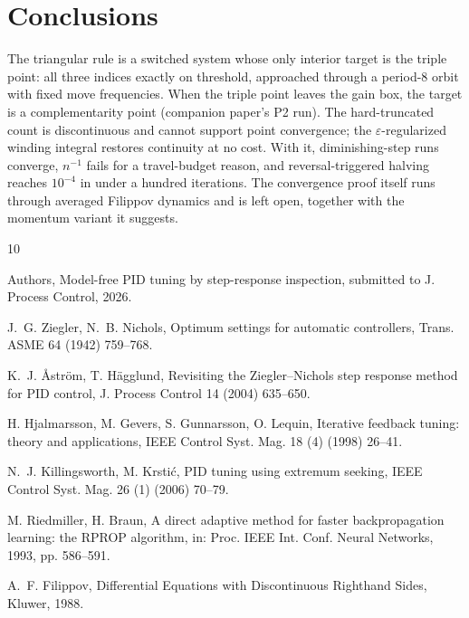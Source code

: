 \documentclass[twocolumn]{ifacconf}
\begin{document}
\section{Conclusions}

The triangular rule is a switched system whose only interior target is the
triple point: all three indices exactly on threshold, approached through a
period-8 orbit with fixed move frequencies. When the triple point leaves the
gain box, the target is a complementarity point (companion paper's P2 run). The
hard-truncated count is discontinuous and cannot support point convergence; the
$\varepsilon$-regularized winding integral restores continuity at no cost. With
it, diminishing-step runs converge, $n^{-1}$ fails for a travel-budget reason,
and reversal-triggered halving reaches $10^{-4}$ in under a hundred iterations.
The convergence proof itself runs through averaged Filippov dynamics and is left
open, together with the momentum variant it suggests.

\begin{thebibliography}{10}

Authors, Model-free PID tuning by step-response inspection, submitted to
J. Process Control, 2026.

J.~G. Ziegler, N.~B. Nichols, Optimum settings for automatic controllers,
Trans. ASME 64 (1942) 759--768.

K.~J. {\AA}str{\"o}m, T. H{\"a}gglund, Revisiting the Ziegler--Nichols
step response method for PID control, J. Process Control 14 (2004) 635--650.

H. Hjalmarsson, M. Gevers, S. Gunnarsson, O. Lequin, Iterative feedback
tuning: theory and applications, IEEE Control Syst. Mag. 18 (4) (1998)
26--41.

N.~J. Killingsworth, M. Krsti{\'c}, PID tuning using extremum seeking,
IEEE Control Syst. Mag. 26 (1) (2006) 70--79.

M. Riedmiller, H. Braun, A direct adaptive method for faster backpropagation
learning: the RPROP algorithm, in: Proc. IEEE Int. Conf. Neural Networks,
1993, pp. 586--591.

A.~F. Filippov, Differential Equations with Discontinuous Righthand Sides,
Kluwer, 1988.

\end{thebibliography}
\end{document}
